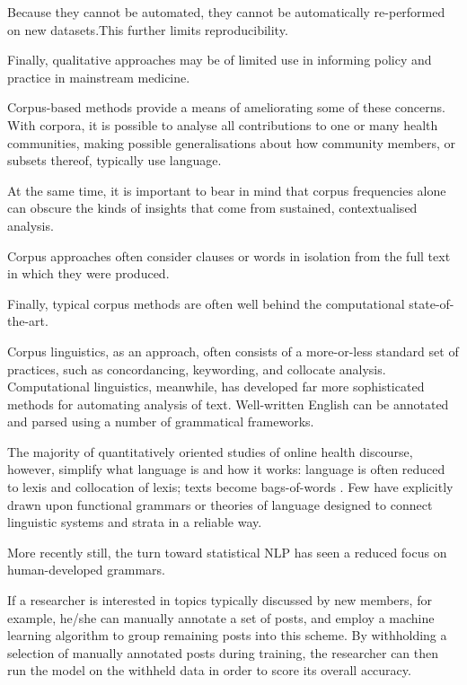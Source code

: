 \documentclass{article}
\renewcommand{\cite}{\parencite}
\begin{document}
Because they cannot be automated, they cannot be automatically re-performed on new datasets.This further limits reproducibility.

Finally, qualitative approaches may be of limited use in informing policy and practice in mainstream medicine.

Corpus-based methods provide a means of ameliorating some of these concerns. With corpora, it is possible to analyse all contributions to one or many health communities, making possible generalisations about how community members, or subsets thereof, typically use language.

At the same time, it is important to bear in mind that corpus frequencies alone can obscure the kinds of insights that come from sustained, contextualised analysis.

Corpus approaches often consider clauses or words in isolation from the full text in which they were produced.

Finally, typical corpus methods are often well behind the computational state-of-the-art.


Corpus linguistics, as an approach, often consists of a more-or-less standard set of practices, such as concordancing, keywording, and collocate analysis. Computational linguistics, meanwhile, has developed far more sophisticated methods for automating analysis of text. Well-written English can be annotated and parsed using a number of grammatical frameworks.

The majority of quantitatively oriented studies of online health discourse, however, simplify what language is and how it works: language is often reduced to lexis and collocation of lexis; texts become bags-of-words \cite[e.g.][]{maclean_forum77:_2015,yesha_method_2015}. Few have explicitly drawn upon functional grammars or theories of language designed to connect linguistic systems and strata in a reliable way.

More recently still, the turn toward statistical NLP has seen a reduced focus on human-developed grammars.

If a researcher is interested in topics typically discussed by new members, for example, he\slash she can manually annotate a set of posts, and employ a machine learning algorithm to group remaining posts into this scheme. By withholding a selection of manually annotated posts during training, the researcher can then run the model on the withheld data in order to score its overall accuracy.
\end{document}
